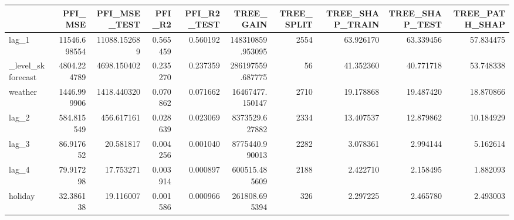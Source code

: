 \begin{tabular}{lrrrrrrrrr}
\toprule
 & PFI\_MSE & PFI\_MSE\_TEST & PFI\_R2 & PFI\_R2\_TEST & TREE\_GAIN & TREE\_SPLIT & TREE\_SHAP\_TRAIN & TREE\_SHAP\_TEST & TREE\_PATH\_SHAP \\
\midrule
lag\_1 & 11546.698554 & 11088.152689 & 0.565459 & 0.560192 & 148310859.953095 & 2554 & 63.926170 & 63.339456 & 57.834475 \\
\_level\_skforecast & 4804.224789 & 4698.150402 & 0.235270 & 0.237359 & 286197559.687775 & 56 & 41.352360 & 40.771718 & 53.748338 \\
weather & 1446.999906 & 1418.440320 & 0.070862 & 0.071662 & 16467477.150147 & 2710 & 19.178868 & 19.487420 & 18.870866 \\
lag\_2 & 584.815549 & 456.617161 & 0.028639 & 0.023069 & 8373529.627882 & 2334 & 13.407537 & 12.879862 & 10.184929 \\
lag\_3 & 86.917652 & 20.581817 & 0.004256 & 0.001040 & 8775440.990013 & 2282 & 3.078361 & 2.994144 & 5.162614 \\
lag\_4 & 79.917298 & 17.753271 & 0.003914 & 0.000897 & 600515.485609 & 2188 & 2.422710 & 2.158495 & 1.882093 \\
holiday & 32.386138 & 19.116007 & 0.001586 & 0.000966 & 261808.695394 & 326 & 2.297225 & 2.465780 & 2.493003 \\
\bottomrule
\end{tabular}
